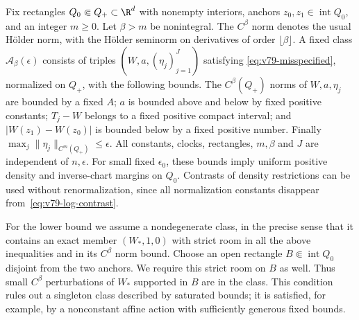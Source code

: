 Fix rectangles $Q_0\Subset Q_+\subset\R^d$ with nonempty interiors,
anchors $z_0,z_1\in\operatorname{int}Q_0$, and an integer $m\ge0$.
Let $\beta>m$ be nonintegral.  The $C^\beta$ norm denotes the usual
H\"older norm, with the H\"older seminorm on derivatives of order
$\lfloor\beta\rfloor$.  A fixed class $\mathcal A_\beta(\epsilon)$
consists of triples $(W,a,(\eta_j)_{j=1}^J)$ satisfying
\eqref{eq:v79-misspecified}, normalized on $Q_+$, with the following
bounds.  The $C^\beta(Q_+)$ norms of $W,a,\eta_j$ are bounded by a
fixed $A$; $a$ is bounded above and below by fixed positive constants;
$T_j-W$ belongs to a fixed positive compact interval; and
$|W(z_1)-W(z_0)|$ is bounded below by a fixed positive number.
Finally $\max_j\|\eta_j\|_{C^m(Q_+)}\le\epsilon$.
All constants, clocks, rectangles, $m,\beta$ and $J$ are independent
of $n,\epsilon$.  For small fixed $\epsilon_0$, these bounds imply
uniform positive density and inverse-chart margins on $Q_0$.
Contrasts of density restrictions can be used without renormalization,
since all normalization constants disappear from~\eqref{eq:v79-log-contrast}.

For the lower bound we assume a nondegenerate class, in the precise
sense that it contains an exact member $(W_*,1,0)$ with strict room in
all the above inequalities and in its $C^\beta$ norm bound.  Choose
an open rectangle $B\Subset\operatorname{int}Q_0$ disjoint from the
two anchors.  We require this strict room on $B$ as well.  Thus small
$C^\beta$ perturbations of $W_*$ supported in $B$ are in the class.
This condition rules out a singleton class described by saturated
bounds; it is satisfied, for example, by a nonconstant affine action
with sufficiently generous fixed bounds.

